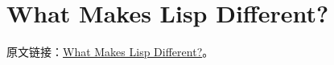 \section{What Makes Lisp Different?}
原文链接：\href{https://norvig.github.io/paip-lisp/#/chapter1?id=\_110-what-makes-lisp-different}{What Makes Lisp Different?}。